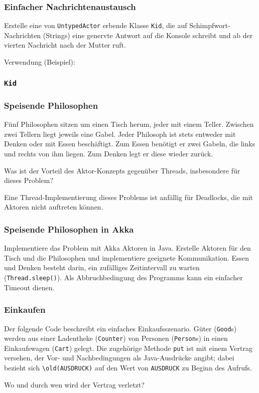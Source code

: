 \documentclass{beamer}
\date{2017-02-06/07}
\begin{document}
\normalsize
\normalem

\lstset{language=Java}

\begin{frame}[plain]
  \titlepage
\end{frame}

\begin{frame}
  \frametitle{Einfacher Nachrichtenaustausch}
  Erstelle eine von \lstinline{UntypedActor} erbende Klasse \lstinline{Kid},
  die auf Schimpfwort-Nachrichten (Strings) eine genervte Antwort auf die Konsole schreibt
  und ab der vierten Nachricht nach der Mutter ruft.
  
  Verwendung (Beispiel):
  
\end{frame}

\begin{frame}
  \frametitle{\lstinline{Kid}}
  
\end{frame}

\begin{frame}
  \frametitle{Speisende Philosophen}
  Fünf Philosophen sitzen um einen Tisch herum,
  jeder mit einem Teller.
  Zwischen zwei Tellern liegt jeweils eine Gabel.
  Jeder Philosoph ist stets entweder mit Denken oder mit Essen beschäftigt.
  Zum Essen benötigt er zwei Gabeln, die links und rechts von ihm liegen.
  Zum Denken legt er diese wieder zurück.
  
  Was ist der Vorteil des Aktor-Konzepts gegenüber Threads,
  insbesondere für dieses Problem?
  
  \pause
  Eine Thread-Implementierung dieses Problems ist anfällig für Deadlocks,
  die mit Aktoren nicht auftreten können.
\end{frame}

\begin{frame}
  \frametitle{Speisende Philosophen in Akka}
  Implementiere das Problem mit Akka Aktoren in Java.
  Erstelle Aktoren für den Tisch und die Philosophen
  und implementiere geeignete Kommunikation.
  Essen und Denken besteht darin, ein zufälliges Zeitintervall zu warten (\lstinline{Thread.sleep()}).
  Als Abbruchbedingung des Programms kann ein einfacher Timeout dienen.
\end{frame}

\begin{frame}[fragile]
  \frametitle{Einkaufen}
  Der folgende Code beschreibt ein einfaches Einkaufsszenario.
  Güter (\lstinline{Good}s) werden aus einer Ladentheke (\lstinline{Counter})
  von Personen (\lstinline{Person}s) in einen Einkaufswagen (\lstinline{Cart}) gelegt.
  Die zugehörige Methode \lstinline{put} ist mit einem Vertrag versehen,
  der Vor- und Nachbedingungen als Java-Ausdrücke angibt;
  dabei bezieht sich \lstinline{\old(AUSDRUCK)}
  auf den Wert von \lstinline{AUSDRUCK} zu Beginn des Aufrufs.
  
  Wo und durch wen wird der Vertrag verletzt?
\end{frame}
\end{document}
